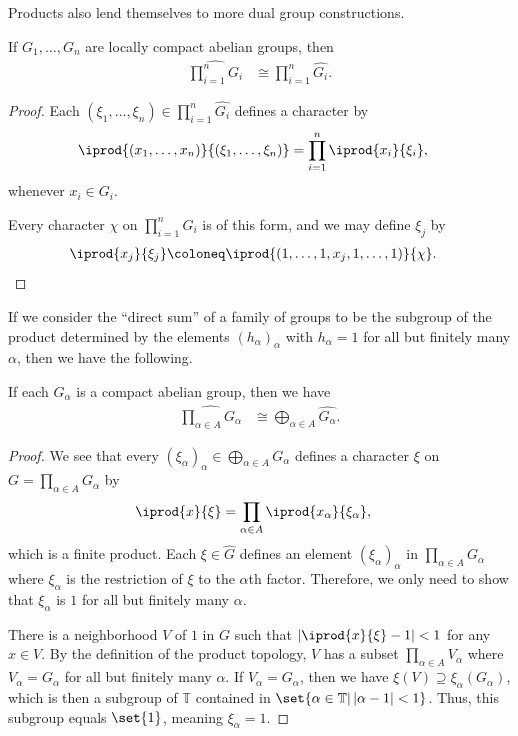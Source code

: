 \documentclass[10pt]{mypackage}
\begin{document}
Products also lend themselves to more dual group constructions.
\begin{proposition}
  If $G_1,\dots,G_n$ are locally compact abelian groups, then
  \begin{align*}
    \widehat{\prod_{i=1}^{n}G_i} &\cong \prod_{i=1}^{n}\widehat{G_i}.
  \end{align*}
\end{proposition}
\begin{proof}
  Each $\left( \xi_1,\dots,\xi_n \right)\in \prod_{i=1}^{n}\widehat{G_i}$ defines a character by
  \begin{align*}
    \iprod{\left( x_1,\dots,x_n \right)}{ \left( \xi_1,\dots,\xi_n \right) } &= \prod_{i=1}^{n} \iprod{x_i}{\xi_i},
  \end{align*}
  whenever $x_i\in G_i$.

  Every character $\chi$ on $ \prod_{i=1}^{n}G_i $ is of this form, and we may define $\xi_j$ by
  \begin{align*}
    \iprod{x_j}{\xi_j} &\coloneq \iprod{\left( 1,\dots,1,x_j,1,\dots,1 \right)}{\chi}.
  \end{align*}
\end{proof}
If we consider the ``direct sum'' of a family of groups to be the subgroup of the product determined by the elements $\left( h_{\alpha} \right)_{\alpha}$ with $h_{\alpha} = 1$ for all but finitely many $\alpha$, then we have the following.
\begin{proposition}
  If each $G_{\alpha}$ is a compact abelian group, then we have
  \begin{align*}
    \widehat{\prod_{\alpha\in A}G_{\alpha}} &\cong \bigoplus_{\alpha\in A} \widehat{G_{\alpha}}.
  \end{align*}
\end{proposition}
\begin{proof}
  We see that every $\left( \xi_{\alpha} \right)_{\alpha}\in \bigoplus_{\alpha\in A}G_{\alpha}$ defines a character $\xi$ on $G = \prod_{\alpha\in A}G_{\alpha}$ by
  \begin{align*}
    \iprod{x}{\xi} &= \prod_{\alpha\in A} \iprod{x_{\alpha}}{\xi_{\alpha}},
  \end{align*}
  which is a finite product. Each $\xi\in \hat{G}$ defines an element $\left( \xi_{\alpha} \right)_{\alpha}$ in $\prod_{\alpha\in A}\widehat{G_{\alpha}}$ where $\xi_{\alpha}$ is the restriction of $\xi$ to the $\alpha$th factor. Therefore, we only need to show that $\xi_{\alpha}$ is $1$ for all but finitely many $\alpha$.

  There is a neighborhood $V$ of $1$ in $G$ such that $ \left\vert \iprod{x}{\xi}-1 \right\vert < 1 $ for any $x\in V$. By the definition of the product topology, $V$ has a subset $\prod_{\alpha\in A}V_{\alpha}$ where $V_{\alpha} = G_{\alpha}$ for all but finitely many $\alpha$. If $V_{\alpha} = G_{\alpha}$, then we have $\xi(V)\supseteq \xi_{\alpha}\left( G_{\alpha} \right)$, which is then a subgroup of $ \mathbb{T} $ contained in $\set{\alpha\in \mathbb{T} | \left\vert \alpha - 1 \right\vert < 1}$. Thus, this subgroup equals $\set{1}$, meaning $\xi_{\alpha} = 1$.
\end{proof}
\end{document}
